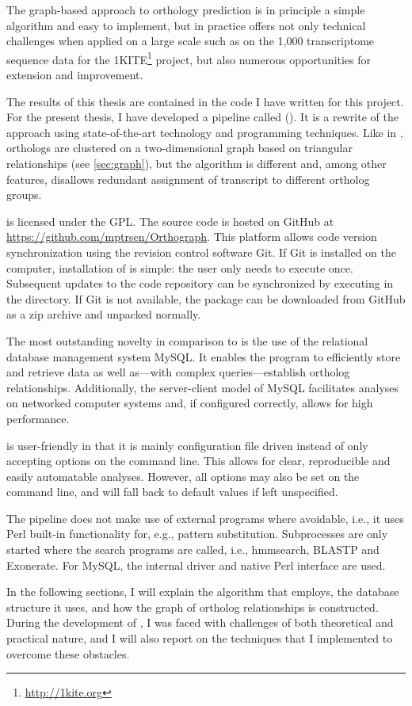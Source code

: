 The graph-based approach to orthology prediction is in principle a simple
algorithm and easy to implement, but in practice offers not only technical
challenges when applied on a large scale such as on the 1,000 transcriptome
sequence data for the 1KITE\footnote{\url{http://1kite.org}} project, but also
numerous opportunities for extension and improvement. 

The results of this thesis are contained in the code I have written for this
project. For the present thesis, I have developed a pipeline called \pname
(\pfullname). It is a rewrite of the \hamstr approach using state-of-the-art
technology and programming techniques. Like in \hamstr, orthologs are clustered
on a two-dimensional graph based on triangular relationships (see
\autoref{sec:graph}), but the algorithm is different and, among other features,
disallows redundant assignment of transcript to different ortholog groups.

\pname is licensed under the GPL. The source code is hosted on GitHub at
\url{https://github.com/mptrsen/Orthograph}. This platform allows code version
synchronization using the revision control software Git. If Git is installed on
the computer, installation of \pname is simple: the user only needs to execute
 once. Subsequent
updates to the code repository can be synchronized by executing 
in the \pname directory. If Git is not available, the package can be downloaded
from GitHub as a zip archive and unpacked normally.

The most outstanding novelty in comparison to \hamstr is the use of the
relational database management system MySQL. It enables the program to
efficiently store and retrieve data as well as---with complex 
queries---establish ortholog relationships. Additionally, the server-client
model of MySQL facilitates analyses on networked computer systems and, if
configured correctly, allows for high performance.

\pname is user-friendly in that it is mainly configuration file driven instead
of only accepting options on the command line. This allows for clear,
reproducible and easily automatable analyses. However, all options may also be
set on the command line, and will fall back to default values if left
unspecified.

The pipeline does not make use of external programs where avoidable, i.e., it
uses Perl built-in functionality for, e.g., pattern substitution. Subprocesses
are only started where the search programs are called, i.e., hmmsearch, BLASTP
and Exonerate. For MySQL, the internal driver and native Perl interface are
used.

In the following sections, I will explain the algorithm that \pname employs, the
database structure it uses, and how the graph of ortholog relationships is
constructed. During the development of \pname, I was faced with challenges of both
theoretical and practical nature, and I will also report on the techniques that
I implemented to overcome these obstacles.
